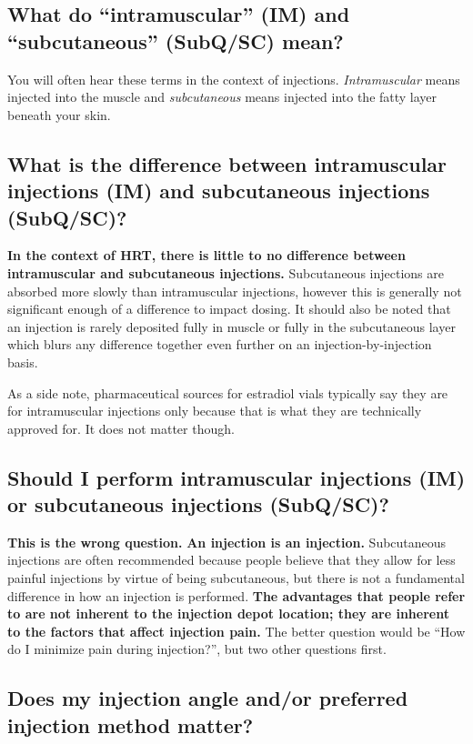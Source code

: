 \documentclass{article}
\begin{document}
\subsection{What do “intramuscular” (IM) and “subcutaneous” (SubQ/SC) mean?}

You will often hear these terms in the context of injections. \textit{Intramuscular} means injected into the muscle and \textit{subcutaneous} means injected into the fatty layer beneath your skin.

\subsection{What is the difference between intramuscular injections (IM) and subcutaneous injections (SubQ/SC)?}

\textbf{In the context of HRT, there is little to no difference between intramuscular and subcutaneous injections.} Subcutaneous injections are absorbed more slowly than intramuscular injections, however this is generally not significant enough of a difference to impact dosing. It should also be noted that an injection is rarely deposited fully in muscle or fully in the subcutaneous layer which blurs any difference together even further on an injection-by-injection basis.

As a side note, pharmaceutical sources for estradiol vials typically say they are for intramuscular injections only because that is what they are technically approved for. It does not matter though.

\subsection{Should I perform intramuscular injections (IM) or subcutaneous injections (SubQ/SC)?}

\textbf{This is the wrong question.} \textbf{An injection is an injection.} Subcutaneous injections are often recommended because people believe that they allow for less painful injections by virtue of being subcutaneous, but there is not a fundamental difference in how an injection is performed. \textbf{The advantages that people refer to are not inherent to the injection depot location; they are inherent to the factors that affect injection pain.} The better question would be “How do I minimize pain during injection?”, but two other questions first.

\subsection{Does my injection angle and/or preferred injection method matter?}
\end{document}

